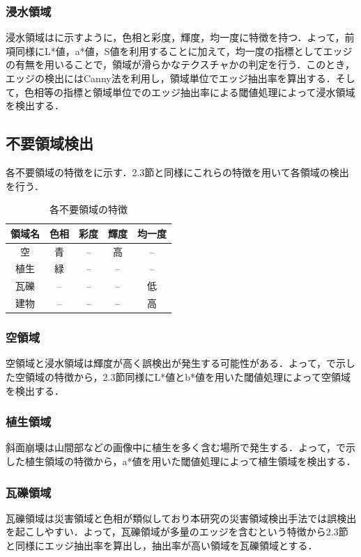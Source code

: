 \documentclass[a4paper, twocolumn, xelatex, 8pt, ja=standard, Ligatures=TeX]{bxjsarticle}
\begin{document}
	\subsubsection{浸水領域}
		浸水領域はに示すように，色相と彩度，輝度，均一度に特徴を持つ．よって，前項同様にL*値，a*値，S値を利用することに加えて，均一度の指標としてエッジの有無を用いることで，領域が滑らかなテクスチャかの判定を行う．このとき，エッジの検出にはCanny法を利用し，領域単位でエッジ抽出率を算出する．そして，色相等の指標と領域単位でのエッジ抽出率による閾値処理によって浸水領域を検出する．

\subsection{不要領域検出}
	各不要領域の特徴をに示す．2.3節と同様にこれらの特徴を用いて各領域の検出を行う．
	
	\begin{table}[b]
		\centering
		\caption{各不要領域の特徴}
		\label{tab02}
		\begin{tabular}{c c c c c}
			\hline
			領域名 & 色相 & 彩度 & 輝度 & 均一度 \\
			\hline
			\hline
			空 & 青 & -- & 高 & -- \\
			植生 & 緑 & -- & -- & -- \\
			瓦礫 & -- & -- & -- & 低 \\
			建物 & -- & -- & -- & 高 \\ \hline
		\end{tabular}
	\end{table}

\subsubsection{空領域}
	空領域と浸水領域は輝度が高く誤検出が発生する可能性がある．よって，で示した空領域の特徴から，2.3節同様にL*値とb*値を用いた閾値処理によって空領域を検出する．

\subsubsection{植生領域}
	斜面崩壊は山間部などの画像中に植生を多く含む場所で発生する．よって，で示した植生領域の特徴から，a*値を用いた閾値処理によって植生領域を検出する．
	
\subsubsection{瓦礫領域}
	瓦礫領域は災害領域と色相が類似しており本研究の災害領域検出手法では誤検出を起こしやすい．よって，瓦礫領域が多量のエッジを含むという特徴から2.3節と同様にエッジ抽出率を算出し，抽出率が高い領域を瓦礫領域とする．
\end{document}
